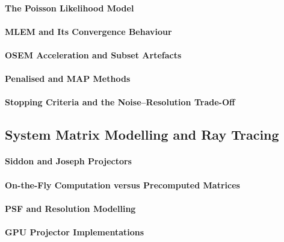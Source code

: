 \paragraph{The Poisson Likelihood Model}

\paragraph{MLEM and Its Convergence Behaviour}

\paragraph{OSEM Acceleration and Subset Artefacts}

\paragraph{Penalised and MAP Methods}

\paragraph{Stopping Criteria and the Noise--Resolution Trade-Off}

\subsection{System Matrix Modelling and Ray Tracing}
\label{sec:system-matrix}

\paragraph{Siddon and Joseph Projectors}

\paragraph{On-the-Fly Computation versus Precomputed Matrices}

\paragraph{PSF and Resolution Modelling}

\paragraph{GPU Projector Implementations}

